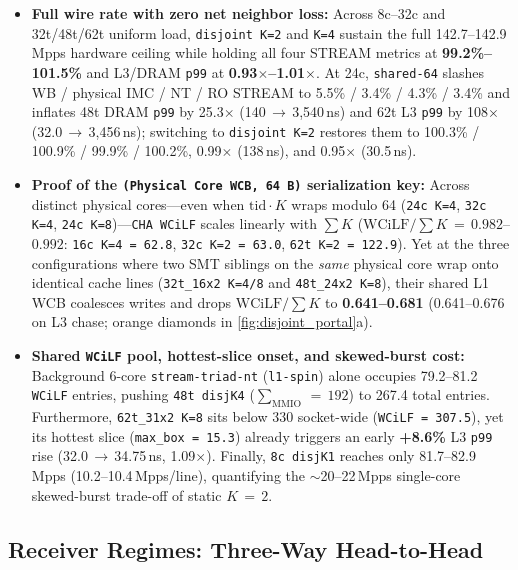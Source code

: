 \begin{itemize}
  \item \textbf{Full wire rate with zero net neighbor loss:} Across 8c--32c and 32t/48t/62t uniform load, \texttt{disjoint K=2} and \texttt{K=4} sustain the full 142.7--142.9\,Mpps hardware ceiling while holding all four STREAM metrics at \textbf{99.2\%--101.5\%} and L3/DRAM \texttt{p99} at \textbf{0.93$\times$--1.01$\times$}. At 24c, \texttt{shared-64} slashes WB / physical IMC / NT / RO STREAM to 5.5\% / 3.4\% / 4.3\% / 3.4\% and inflates 48t DRAM \texttt{p99} by 25.3$\times$ (140\,$\to$\,3,540\,ns) and 62t L3 \texttt{p99} by 108$\times$ (32.0\,$\to$\,3,456\,ns); switching to \texttt{disjoint K=2} restores them to 100.3\% / 100.9\% / 99.9\% / 100.2\%, 0.99$\times$ (138\,ns), and 0.95$\times$ (30.5\,ns).
  \item \textbf{Proof of the \texttt{(Physical Core WCB, 64\,B)} serialization key:} Across distinct physical cores---even when $\text{tid} \cdot K$ wraps modulo 64 (\texttt{24c K=4}, \texttt{32c K=4}, \texttt{24c K=8})---\texttt{CHA WCiLF} scales linearly with $\sum K$ ($\text{WCiLF}/\sum K\,=\,0.982$--$0.992$: \texttt{16c K=4\,=\,62.8}, \texttt{32c K=2\,=\,63.0}, \texttt{62t K=2\,=\,122.9}). Yet at the three configurations where two SMT siblings on the \emph{same} physical core wrap onto identical cache lines (\texttt{32t\_16x2 K=4/8} and \texttt{48t\_24x2 K=8}), their shared L1 WCB coalesces writes and drops $\text{WCiLF}/\sum K$ to \textbf{0.641--0.681} (0.641--0.676 on L3 chase; orange diamonds in \autoref{fig:disjoint_portal}a).
  \item \textbf{Shared \texttt{WCiLF} pool, hottest-slice onset, and skewed-burst cost:} Background 6-core \texttt{stream-triad-nt} (\texttt{l1-spin}) alone occupies 79.2--81.2 \texttt{WCiLF} entries, pushing \texttt{48t disjK4} ($\sum_{\text{MMIO}}\,=\,192$) to 267.4 total entries. Furthermore, \texttt{62t\_31x2 K=8} sits below 330 socket-wide (\texttt{WCiLF\,=\,307.5}), yet its hottest slice (\texttt{max\_box\,=\,15.3}) already triggers an early \textbf{+8.6\%} L3 \texttt{p99} rise (32.0\,$\to$\,34.75\,ns, 1.09$\times$). Finally, \texttt{8c disjK1} reaches only 81.7--82.9\,Mpps (10.2--10.4\,Mpps/line), quantifying the $\sim$20--22\,Mpps single-core skewed-burst trade-off of static $K\,=\,2$.
\end{itemize}

\subsection{Receiver Regimes: Three-Way Head-to-Head}
\label{sec:eval_rx}

